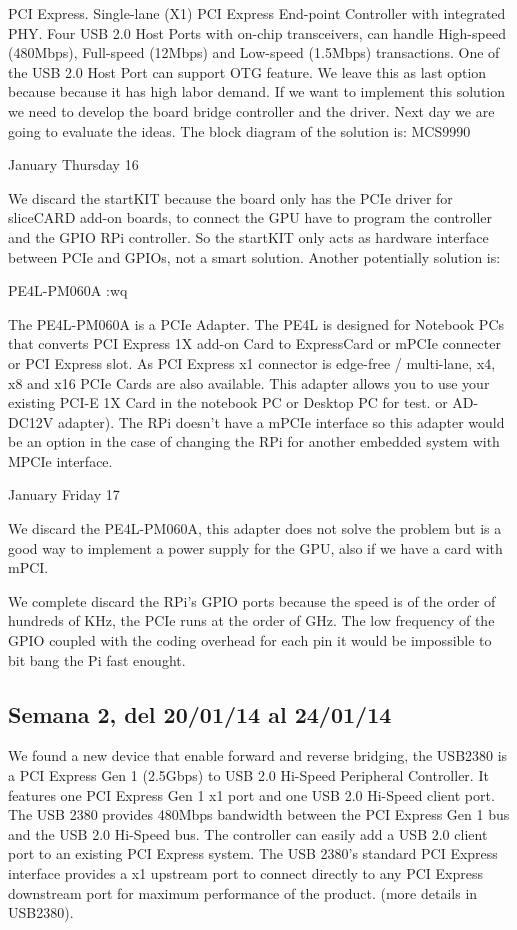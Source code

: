 \documentclass[11pt,twoside]{report}
\begin{document}
PCI Express.
Single-lane (X1) PCI Express End-point Controller with integrated PHY.
Four USB 2.0 Host Ports with on-chip transceivers, can handle High-speed (480Mbps), Full-speed (12Mbps) and Low-speed (1.5Mbps) transactions.
One of the USB 2.0 Host Port can support OTG feature. We leave this as last option because because it has high labor demand. If we want to implement this solution we need to develop the board bridge controller and the driver. Next day we are going to evaluate the ideas. The block diagram of the solution is:
MCS9990

January Thursday 16

We discard the startKIT because the board only has the PCIe driver for sliceCARD add-on boards, to connect the GPU have to program the controller and the GPIO RPi controller. So the startKIT only acts as hardware interface between PCIe and GPIOs, not a smart solution. Another potentially solution is:

PE4L-PM060A
:wq



The PE4L-PM060A is a PCIe Adapter. The PE4L is designed for Notebook PCs that converts PCI Express 1X add-on Card to ExpressCard or mPCIe connecter or PCI Express slot. As PCI Express x1 connector is edge-free / multi-lane, x4, x8 and x16 PCIe Cards are also available. This adapter allows you to use your existing PCI-E 1X Card in the notebook PC or Desktop PC for test. or AD-DC12V adapter). The RPi doesn't have a mPCIe interface so this adapter would be an option in the case of changing the RPi for another embedded system with MPCIe interface.

January Friday 17

We discard the PE4L-PM060A, this adapter does not solve the problem but is a good way to implement a power supply for the GPU, also if we have a card with mPCI.

We complete discard the RPi's GPIO ports because the speed is of the order of hundreds of KHz, the PCIe runs at the order of GHz. The low frequency of the GPIO coupled with the coding overhead for each pin it would be impossible to bit bang the Pi fast enought.
\subsection*{Semana 2, del 20/01/14 al 24/01/14}


We found a new device that enable forward and reverse bridging, the USB2380 is a PCI Express Gen 1 (2.5Gbps) to USB 2.0 Hi-Speed Peripheral Controller. It features one PCI Express Gen 1 x1 port and one USB 2.0 Hi-Speed client port. The USB 2380 provides 480Mbps bandwidth between the PCI Express Gen 1 bus and the USB 2.0 Hi-Speed bus. The controller can easily add a USB 2.0 client port to an existing PCI Express system. The USB 2380's standard PCI Express interface provides a x1 upstream port to connect directly to any PCI Express downstream port for maximum performance of the product. (more details in USB2380).
\end{document}
